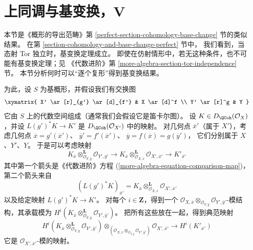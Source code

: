 \section{上同调与基变换，V}
\label{section-cohomology-base-change}

\noindent
本节是《概形的导出范畴》第
\ref{perfect-section-cohomology-base-change} 节的类似结果。
在第 \ref{section-cohomology-and-base-change-perfect} 节中，
我们看到，当态射 Tor 独立时，基变换定理成立。
即使在仿射情形中，若无这种条件，也不可能有基变换定理；见
《代数进阶》第 \ref{more-algebra-section-tor-independence} 节。
本节分析何时可以“逐个复形”得到基变换结果。

\medskip\noindent
为此，设 $S$ 为基概形，并假设我们有交换图
$$
\xymatrix{
X' \ar[r]_{g'} \ar[d]_{f'} &
X \ar[d]^f \\
Y' \ar[r]^g &
Y
}
$$
它由 $S$ 上的代数空间组成（通常我们会假设它是笛卡尔图）。
设 $K \in D_\QCoh(\mathcal{O}_X)$，并设
$L(g')^*K \to K'$ 是 $D_\QCoh(\mathcal{O}_{X'})$ 中的映射。
对几何点 $\overline{x}'$（属于 $X'$），考虑几何点
$\overline{x} = g'(\overline{x}')$、
$\overline{y}' = f'(\overline{x}')$、
$\overline{y} = f(\overline{x}) = g(\overline{y}')$，
它们分别属于 $X$、$Y'$、$Y$。
于是可以考虑映射
$$
K_{\overline{x}}
\otimes_{\mathcal{O}_{Y, \overline{y}}}^\mathbf{L}
\mathcal{O}_{Y', \overline{y}'}
\to
K_{\overline{x}}
\otimes_{\mathcal{O}_{X, \overline{x}}}^\mathbf{L}
\mathcal{O}_{X', \overline{x}'} \to
K'_{\overline{x}'}
$$
其中第一个箭头是《代数进阶》方程
(\ref{more-algebra-equation-comparison-map})，第二个箭头来自
$$
(L(g')^*K)_{\overline{x}'} =
K_{\overline{x}} \otimes_{\mathcal{O}_{X, \overline{x}}}^\mathbf{L}
\mathcal{O}_{X', \overline{x}'}
$$
以及给定映射 $L(g')^*K \to K'$。
对每个 $i \in \mathbf{Z}$，得到一个
$\mathcal{O}_{X, \overline{x}} \otimes_{\mathcal{O}_{Y, \overline{y}}}
\mathcal{O}_{Y', \overline{y}'}$-模结构，其承载模为
$H^i(K_{\overline{x}}
\otimes_{\mathcal{O}_{Y, \overline{y}}}^\mathbf{L}
\mathcal{O}_{Y', \overline{y}'})$。
把所有这些放在一起，得到典范映射
\begin{equation}
\label{equation-bc}
H^i(K_{\overline{x}}
\otimes_{\mathcal{O}_{Y, \overline{y}}}^\mathbf{L}
\mathcal{O}_{Y', \overline{y}'})
\otimes_{(\mathcal{O}_{X, \overline{x}}
\otimes_{\mathcal{O}_{Y, \overline{y}}}
\mathcal{O}_{Y', \overline{y}'})}
\mathcal{O}_{X', \overline{x}'}
\longrightarrow
H^i(K'_{\overline{x}'})
\end{equation}
它是 $\mathcal{O}_{X', \overline{x}'}$-模的映射。

